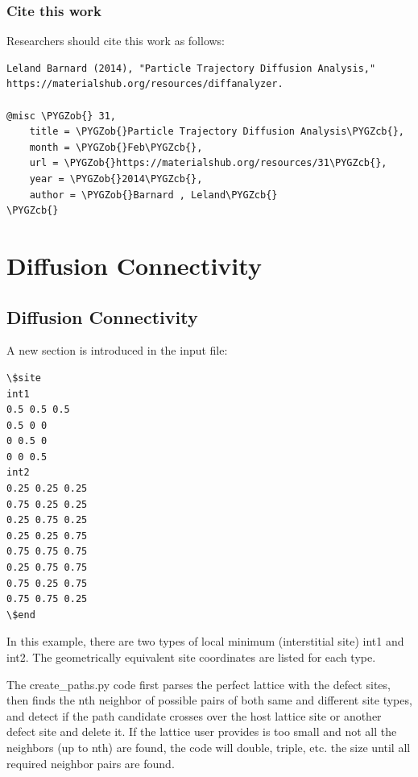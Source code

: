 \documentclass[letterpaper,10pt,english]{sphinxmanual}
\def\PYGZob{\char`\{}
\def\PYGZcb{\char`\}}
\begin{document}
\subsubsection{Cite this work}
\label{8_0_3_diffanalyzer:cite-this-work}
Researchers should cite this work as follows:

\begin{Verbatim}[commandchars=\\\{\}]
Leland Barnard (2014), "Particle Trajectory Diffusion Analysis," https://materialshub.org/resources/diffanalyzer.

@misc \PYGZob{} 31,
    title = \PYGZob{}Particle Trajectory Diffusion Analysis\PYGZcb{},
    month = \PYGZob{}Feb\PYGZcb{},
    url = \PYGZob{}https://materialshub.org/resources/31\PYGZcb{},
    year = \PYGZob{}2014\PYGZcb{},
    author = \PYGZob{}Barnard , Leland\PYGZcb{}
\PYGZcb{}
\end{Verbatim}


\section{Diffusion Connectivity}
\label{8_0_standalonetools:diffusion-connectivity}

\subsection{Diffusion Connectivity}
\label{8_0_1_diffusionconnectivity::doc}\label{8_0_1_diffusionconnectivity:diffusionconnectivity}\label{8_0_1_diffusionconnectivity:diffusion-connectivity}
A new section is introduced in the input file:

\begin{Verbatim}[commandchars=\\\{\}]
\$site
int1
0.5 0.5 0.5
0.5 0 0
0 0.5 0
0 0 0.5
int2
0.25 0.25 0.25
0.75 0.25 0.25
0.25 0.75 0.25
0.25 0.25 0.75
0.75 0.75 0.75
0.25 0.75 0.75
0.75 0.25 0.75
0.75 0.75 0.25
\$end
\end{Verbatim}

In this example, there are two types of local minimum (interstitial site) int1 and int2. The geometrically equivalent site coordinates are listed for each type.

The create\_paths.py code first parses the perfect lattice with the defect sites, then finds the nth neighbor of possible pairs of both same and different site types, and detect if the path candidate crosses over the host lattice site or another defect site and delete it.
If the lattice user provides is too small and not all the neighbors (up to nth) are found, the code will double, triple, etc. the size until all required neighbor pairs are found.
\end{document}
